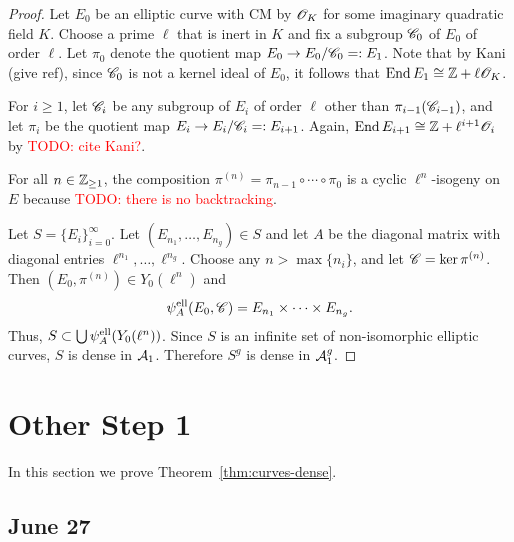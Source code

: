 \documentclass{amsart}
\begin{document}
\begin{proof}
 Let $E_0$ be an elliptic curve with CM by $\mathscr{O}_K$ for some imaginary quadratic field $K$. Choose a prime $\ell$ that is inert in $K$ and fix a subgroup $\mathscr{C}_0$ of $E_0$ of order $\ell$. Let $\pi_0$ denote the quotient map $E_0 \to E_0/\mathscr{C}_0 =: E_1$. Note that by Kani (give ref), since $\mathscr{C}_0$ is not a kernel ideal of $E_0$, it follows that $\operatorname{End} E_1 \cong \mathbb{Z} + \ell\mathscr{O}_K$.

 For $i \ge 1$, let $\mathscr{C}_i$ be any subgroup of $E_i$ of order $\ell$ other than $\pi_{i-1}(\mathscr{C}_{i-1})$, and let $\pi_i$ be the quotient map $E_i \to E_i/\mathscr{C}_i =: E_{i+1}$. Again, $\operatorname{End} E_{i+1} \cong \mathbb{Z} + \ell^{i+1}\mathscr{O}_{i}$ by \textcolor{red}{TODO: cite Kani?}.

 For all $n \in \mathbb{Z}_{\ge 1}$, the composition $\pi^{(n)} = \pi_{n-1} \circ \cdots \circ \pi_0$ is a cyclic $\ell^n$-isogeny on $E$ because \textcolor{red}{TODO: there is no backtracking}.

 Let $S = \{E_i\}_{i=0}^\infty$. Let $(E_{n_1},\dots,E_{n_g}) \in S$ and let $A$ be the diagonal matrix with diagonal entries $\ell^{n_1},\dots,\ell^{n_g}$.  Choose any $n > \max\{n_i\}$, and let $\mathscr{C} = \ker \pi^{(n)}$. Then $(E_0,\pi^{(n)}) \in Y_0(\ell^n)$ and
 \[
   \psi_{A}^\mathrm{ell}(E_0,\mathscr{C}) = E_{n_1} \times \cdots \times E_{n_g}.
 \]
Thus, $S \subset \bigcup\psi_{A}^\mathrm{ell}(Y_0(\ell^n))$. Since $S$ is an infinite set of non-isomorphic elliptic curves, $S$ is dense in $\mathcal{A}_1$. Therefore $S^g$ is dense in $\mathcal{A}_1^g$.
\end{proof}










\newpage

\section{Other Step 1}

In this section we prove Theorem~\ref{thm:curves-dense}.


\subsection{June 27}
\end{document}
